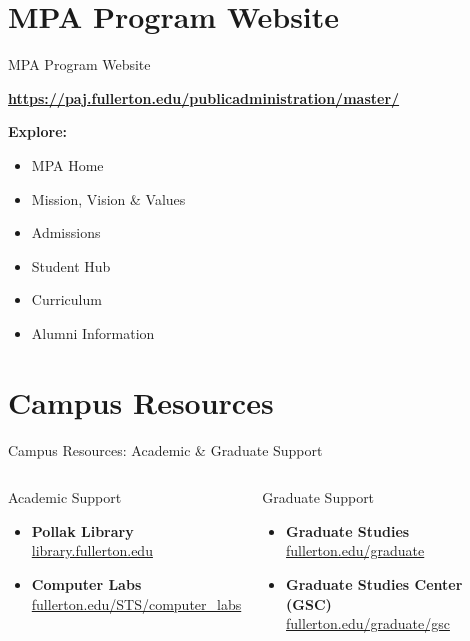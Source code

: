\documentclass[10pt]{beamer}
\begin{document}
\section{\textcolor{titanorange}{MPA Program Website}}
\begin{frame}{MPA Program Website}
\begin{Large}
  \href{https://paj.fullerton.edu/publicadministration/master/}{\textbf{https://paj.fullerton.edu/publicadministration/master/}}\par\vspace{0.6em}
  \textbf{Explore:}
  \begin{itemize}
    \item MPA Home
    \item Mission, Vision \& Values
    \item Admissions
    \item Student Hub
    \item Curriculum
    \item Alumni Information
  \end{itemize}
\end{Large}
\end{frame}

\section{\textcolor{titanorange}{Campus Resources}}

\begin{frame}{Campus Resources: Academic \& Graduate Support}
\begin{columns}[T,onlytextwidth]
  \begin{block}{Academic Support}
    \begin{itemize}\setlength{\itemsep}{4pt}
      \item \textbf{Pollak Library}\\[-2pt]
        \footnotesize\href{https://library.fullerton.edu}{library.fullerton.edu}
      \item \textbf{Computer Labs}\\[-2pt]
        \footnotesize\href{https://www.fullerton.edu/STS/computer_labs}{fullerton.edu/STS/computer\_labs}
    \end{itemize}
  \end{block}

  \begin{block}{Graduate Support}
    \begin{itemize}\setlength{\itemsep}{4pt}
      \item \textbf{Graduate Studies}\\[-2pt]
        \footnotesize\href{https://www.fullerton.edu/graduate}{fullerton.edu/graduate}
      \item \textbf{Graduate Studies Center (GSC)}\\[-2pt]
        \footnotesize\href{https://www.fullerton.edu/graduate/gsc}{fullerton.edu/graduate/gsc}
    \end{itemize}
  \end{block}
\end{columns}
\end{frame}
\end{document}

